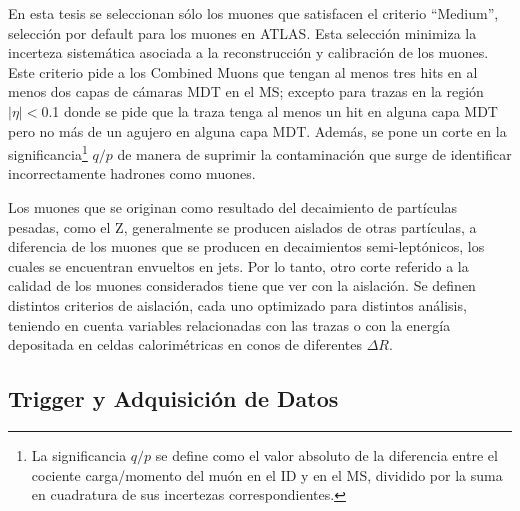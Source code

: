 En esta tesis se seleccionan sólo los muones que satisfacen el criterio ``Medium'', selección por default para los muones en ATLAS. Esta selección minimiza la incerteza sistemática asociada a la reconstrucción y calibración de los muones. Este criterio pide a los Combined Muons que tengan al menos tres hits en al menos dos capas de cámaras MDT en el MS; excepto para trazas en la región $|\eta|<$0.1 donde se pide que la traza tenga al menos un hit en alguna capa MDT pero no más de un agujero en alguna capa MDT. Además, se pone un corte en la significancia\footnote{La significancia $q/p$ se define como el valor absoluto de la diferencia entre el cociente carga/momento del muón en el ID y en el MS, dividido por la suma en cuadratura de sus incertezas correspondientes.} $q/p$ de manera de suprimir la contaminación que surge de identificar incorrectamente hadrones como muones. 

Los muones que se originan como resultado del decaimiento de partículas pesadas, como el Z, generalmente se producen aislados de otras partículas, a diferencia de los muones que se producen en decaimientos semi-leptónicos, los cuales se encuentran envueltos en jets. Por lo tanto, otro corte referido a la calidad de los muones considerados tiene que ver con la aislación. Se definen distintos criterios de aislación, cada uno optimizado para distintos análisis, teniendo en cuenta variables relacionadas con las trazas o con la energía depositada en celdas calorimétricas en conos de diferentes $\Delta R$. 


\subsection{Trigger y Adquisición de Datos}

